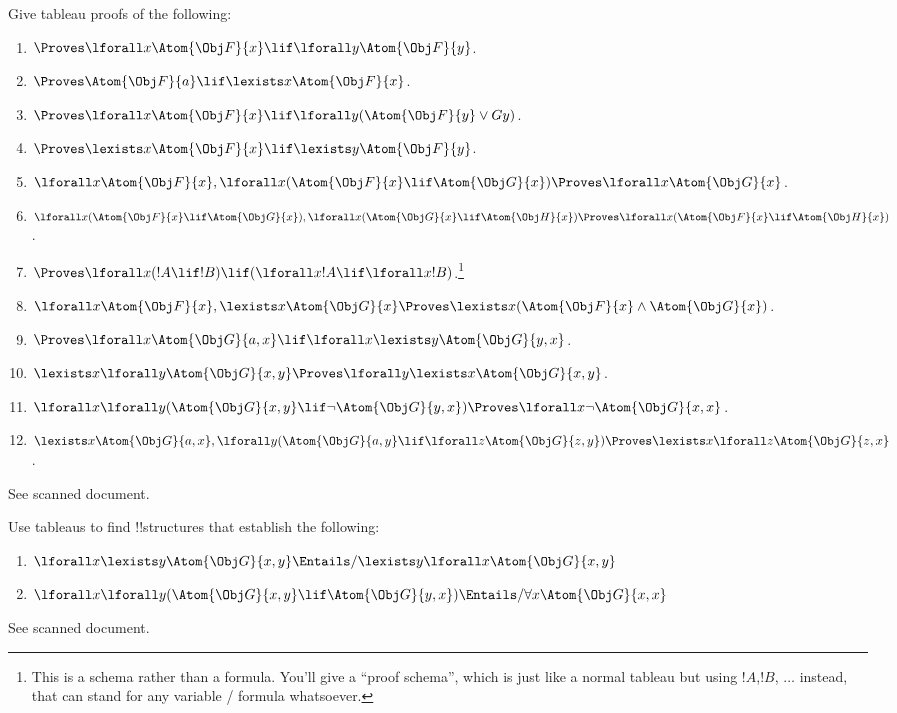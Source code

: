 \documentclass[../../../../include/open-logic-section]{subfiles}
\begin{document}


\begin{prob}
Give tableau proofs of the following:
\begin{enumerate}
\item $\Proves\lforall x\Atom{\Obj F}{x}\lif\lforall y\Atom{\Obj F}{y}$.
\item $\Proves \Atom{\Obj F}{a}\lif\lexists x\Atom{\Obj F}{x}$.
\item $\Proves\lforall x\Atom{\Obj F}{x}\lif\lforall y(\Atom{\Obj F}{y}\lor Gy)$.
\item $\Proves\lexists x\Atom{\Obj F}{x}\lif\lexists y\Atom{\Obj F}{y}$.
\item $\lforall x\Atom{\Obj F}{x},\lforall x(\Atom{\Obj F}{x}\lif \Atom{\Obj G}{x})\Proves\lforall x\Atom{\Obj G}{x}$.
\item $\lforall x(\Atom{\Obj F}{x}\lif \Atom{\Obj G}{x}),\lforall x(\Atom{\Obj G}{x}\lif \Atom{\Obj H}{x})\Proves\lforall x(\Atom{\Obj F}{x}\lif \Atom{\Obj H}{x})$.
\item $\Proves\lforall x(!A \lif !B)\lif(\lforall x !A\lif\lforall x !B)$.\footnote{This is a schema rather than a formula. You'll give a ``proof schema'', which is just like a normal tableau but using
$!A$,$!B$, $\ldots$ instead, that can stand for any variable / formula whatsoever.}
\item $\lforall x\Atom{\Obj F}{x},\lexists x\Atom{\Obj G}{x}\Proves\lexists x(\Atom{\Obj F}{x}\land \Atom{\Obj G}{x})$.
\item $\Proves\lforall x\Atom{\Obj G}{a,x}\lif\lforall x\lexists y\Atom{\Obj G}{y,x}$.
\item $\lexists x\lforall y\Atom{\Obj G}{x,y}\Proves\lforall y\lexists x\Atom{\Obj G}{x,y}$.
\item $\lforall x\lforall y(\Atom{\Obj G}{x,y}\lif\lnot \Atom{\Obj G}{y,x})\Proves\lforall x\lnot \Atom{\Obj G}{x,x}$.
\item $\lexists x\Atom{\Obj G}{a,x},\lforall y(\Atom{\Obj G}{a,y}\lif\lforall z\Atom{\Obj G}{z,y})\Proves\lexists x\lforall z\Atom{\Obj G}{z,x}$.
\end{enumerate}
\begin{ans}
	See scanned document.
\end{ans}
\end{prob}

\begin{prob}
Use tableaus to find !!{structure}s that establish the following:
\begin{enumerate}
	\item $\lforall x \lexists y \Atom{\Obj G}{x,y} \Entails/ \lexists y \lforall x \Atom{\Obj G}{x,y}$ 
	\item $\lforall x \lforall y (\Atom{\Obj G}{x,y} \lif \Atom{\Obj G}{y,x}) \Entails/ \forall x \Atom{\Obj G}{x,x}$
\end{enumerate}
\begin{ans}
	See scanned document.
\end{ans}
\end{prob}
\end{document}
